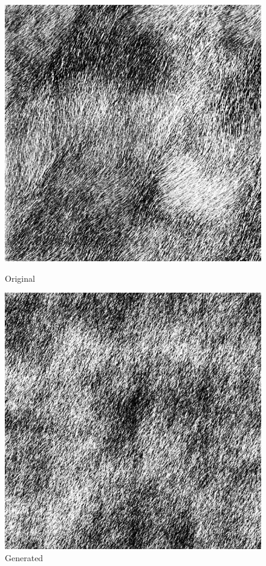 \documentclass{article}
\begin{document}
    \begin{figure}[!htb]
    \begin{center}
      \includegraphics[scale=.3]{5/report/random/8.png}
      \caption{Original}
    \end{center}
    \endminipage \hfill
    \begin{center}
      \includegraphics[scale=.3]{5/report/random/8_c.png}
      \caption{Generated}
    \end{center}
    \endminipage
    \end{figure}
\end{document}
